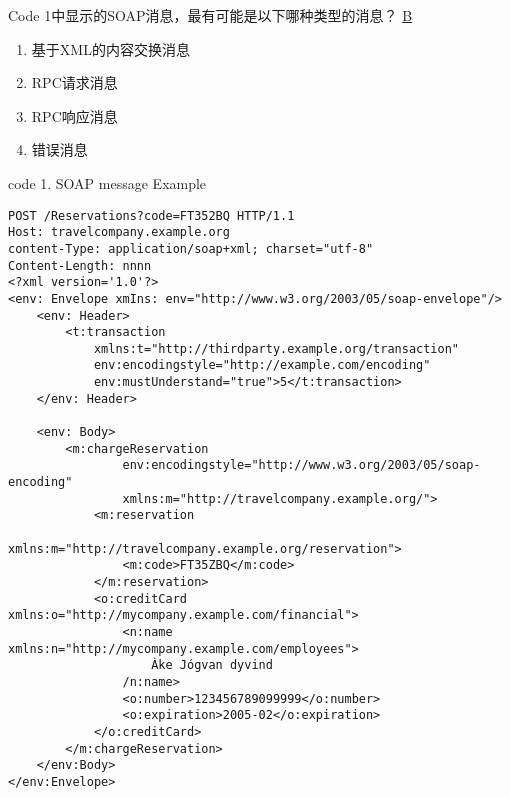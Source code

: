 \begin{problem}
Code 1中显示的SOAP消息，最有可能是以下哪种类型的消息？
\uline{B}
\vspace{-0.8em}
\begin{multicols}{2}
    \begin{enumerate}[label=\Alph*.]
        \item 基于XML的内容交换消息
        \item RPC请求消息
        \item RPC响应消息
        \item 错误消息
    \end{enumerate}
\end{multicols}
\vspace{-1em}
\end{problem}


\begin{center}
\vspace{-0.5em}
code 1. SOAP message Example
\vspace{-1em}
\end{center}
\begin{lstlisting}
POST /Reservations?code=FT352BQ HTTP/1.1
Host: travelcompany.example.org
content-Type: application/soap+xml; charset="utf-8"
Content-Length: nnnn
<?xml version='1.0'?>
<env: Envelope xmIns: env="http://www.w3.org/2003/05/soap-envelope"/>
    <env: Header>
        <t:transaction
            xmlns:t="http://thirdparty.example.org/transaction"
            env:encodingstyle="http://example.com/encoding"
            env:mustUnderstand="true">5</t:transaction>
    </env: Header>

    <env: Body>
        <m:chargeReservation
                env:encodingstyle="http://www.w3.org/2003/05/soap-encoding"
                xmlns:m="http://travelcompany.example.org/">
            <m:reservation
                    xmlns:m="http://travelcompany.example.org/reservation">
                <m:code>FT35ZBQ</m:code>
            </m:reservation>
            <o:creditCard xmlns:o="http://mycompany.example.com/financial"> 
                <n:name xmlns:n="http://mycompany.example.com/employees">
                    Àke Jógvan dyvind 
                /n:name>
                <o:number>123456789099999</o:number>
                <o:expiration>2005-02</o:expiration>
            </o:creditCard>
        </m:chargeReservation> 
    </env:Body>
</env:Envelope>
\end{lstlisting}


